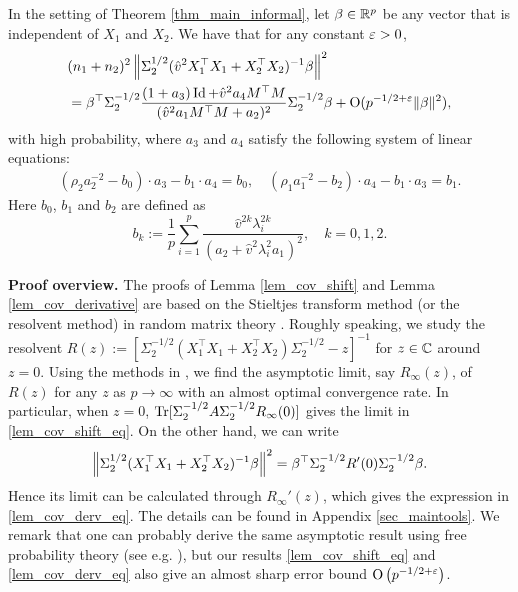 \begin{lemma}\label{lem_cov_derivative}
In the setting of Theorem \ref{thm_main_informal}, let $\beta \in \mathbb{R}^p$ be any vector that is independent of $X_1$ and $X_2$. We have that for any constant ${\varepsilon}>0$,
\begin{equation}\label{lem_cov_derv_eq}
\begin{split}
&(n_1+n_2)^2\left\| \Sigma_2^{1/2} (\hat v^2 X_1^{\top}X_1 + X_2^{\top}X_2)^{-1}\beta \right\|^2 \\
&= \beta^{\top} \Sigma_2^{-1/2}  \frac{(1 + a_3)\operatorname{Id} + \hat v^2a_4 {M}^{\top}{M}}{( \hat v^2a_1 {M}^{\top}{M}+a_2)^2} \Sigma_2^{-1/2} \beta +\operatorname{O}(p^{-1/2+{\varepsilon}}\|\beta\|^2),
\end{split}
\end{equation}
with high probability, where $a_{3}$ and $a_4$ satisfy the following system of linear equations:
\begin{gather}\label{eq_a34extra}
		\left(\rho_2  a_2^{-2}-  b_0\right)\cdot  a_3 - b_1 \cdot  a_4
		= b_0, \quad \left(\rho_1 a_1^{-2} -  b_2  \right)\cdot  a_4 -  b_1 \cdot  a_3 = b_1 .
	\end{gather}
Here $b_0$, $b_1$ and $b_2$ are defined as
$$ b_k:= \frac1{p}\sum_{i=1}^p \frac{ \hat v^{2k}\lambda_i^{2k}}{ ( a_2 + \hat v^2\lambda_i^2 a_1)^2  },\quad k=0,1,2.$$
\end{lemma}


\medskip
\noindent\textbf{Proof overview.}
The proofs of Lemma \ref{lem_cov_shift} and Lemma \ref{lem_cov_derivative} are based on the Stieltjes transform method (or the resolvent method) in random matrix theory \cite{bai2009spectral,tao2012topics,erdos2017dynamical}. Roughly speaking, we study the resolvent $R(z):=[\Sigma_2^{-1/2}( X_1^{\top}X_1 + X_2^{\top}X_2)\Sigma_2^{-1/2}-z]^{-1}$ for $z\in \mathbb{C}$ around $z=0$.
Using the methods in \cite{Anisotropic,yang2019spiked}, we find the asymptotic limit, say $R_\infty(z)$, of $R(z)$ for any $z$ as $p\to \infty$ with an almost optimal convergence rate. In particular, when $z=0$, $\operatorname{Tr}[\Sigma_2^{-1/2}A\Sigma_2^{-1/2}R_\infty(0)]$ gives the limit in \eqref{lem_cov_shift_eq}. 
On the other hand, we can write 
$$\left\| \Sigma_2^{1/2} (X_1^{\top}X_1 + X_2^{\top}X_2)^{-1}\beta \right\|^2= \beta^\top \Sigma_2^{-1/2}R'(0)\Sigma_2^{-1/2} \beta.$$ 
Hence its limit can be calculated through $R_\infty'(z)$, which gives the expression in \eqref{lem_cov_derv_eq}. The details can be found in Appendix \ref{sec_maintools}. 
We remark that one can probably derive the same asymptotic result using free probability theory (see e.g. \cite{nica2006lectures}), but our results \eqref{lem_cov_shift_eq} and \eqref{lem_cov_derv_eq} also give an almost sharp error bound $\operatorname{O}\left( p^{-1/2+\varepsilon}\right)$.


